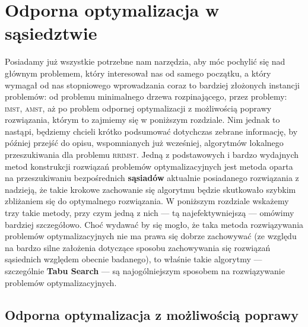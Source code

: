 \chapter{Odporna optymalizacja w sąsiedztwie}\label{ch:localSearch}
\thispagestyle{chapterBeginStyle}

Posiadamy już wszystkie potrzebne nam narzędzia, aby móc pochylić się nad głównym problemem, który interesował nas od samego początku, a który wymagał od nas stopniowego wprowadzania coraz to bardziej złożonych instancji problemów: od problemu minimalnego drzewa rozpinającego, przez problemy: \textsc{imst}, \textsc{amst}, aż po problem odpornej optymalizacji z możliwością poprawy rozwiązania, którym to zajmiemy się w poniższym rozdziale. Nim jednak to nastąpi, będziemy chcieli krótko podsumować dotychczas zebrane informację, by później przejść do opisu, wspomnianych już wcześniej, algorytmów lokalnego przeszukiwania dla problemu \textsc{rrimst}. Jedną z podstawowych i bardzo wydajnych metod konstrukcji rozwiązań problemów optymalizacyjnych jest metoda oparta na przeszukiwaniu bezpośrednich \textbf{sąsiadów} aktualnie posiadanego rozwiązania z nadzieją, że takie krokowe zachowanie się algorytmu będzie skutkowało szybkim zbliżaniem się do optymalnego rozwiązania. W poniższym rozdziale wskażemy trzy takie metody, przy czym jedną z nich --- tą najefektywniejszą --- omówimy bardziej szczegółowo. Choć wydawać by się mogło, że taka metoda rozwiązywania problemów optymalizacyjnych nie ma prawa się dobrze zachowywać (ze względu na bardzo silne założenia dotyczące sposobu zachowywania się rozwiązań sąsiednich względem obecnie badanego), to właśnie takie algorytmy --- szczególnie \textbf{Tabu Search} --- są najogólniejszym sposobem na rozwiązywanie problemów optymalizacyjnych.

\section{Odporna optymalizacja z możliwością poprawy}

